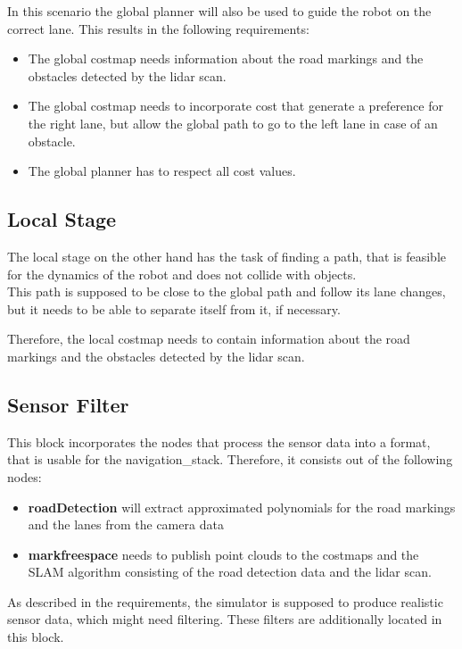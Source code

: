 In this scenario the global planner will also be used to guide the robot on the correct lane. This results in the following requirements:

\begin{itemize}
	\item The global costmap needs information about the road markings and the obstacles detected by the lidar scan.
	\item The global costmap needs to incorporate cost that generate a preference for the right lane, but allow the global path to go to the left lane in case of an obstacle.
	\item The global planner has to respect all cost values.
\end{itemize}

\subsection{Local Stage}
The local stage on the other hand has the task of finding a path, that is feasible for the dynamics of the robot and does not collide with objects.\\
This path is supposed to be close to the global path and follow its lane changes, but it needs to be able to separate itself from it, if necessary.

Therefore, the local costmap needs to contain information about the road markings and the obstacles detected by the lidar scan.


\subsection{Sensor Filter}

This block incorporates the nodes that process the sensor data into a format, that is usable for the navigation\_stack. 
Therefore, it consists out of the following nodes:

\begin{itemize}
	\item \textbf{roadDetection} will extract approximated polynomials for the road markings and the lanes from the camera data
	\item \textbf{markfreespace} needs to publish point clouds to the costmaps and the SLAM algorithm consisting of the road detection data and the lidar scan.
\end{itemize}

As described in the requirements, the simulator is supposed to produce realistic sensor data, which might need filtering. These filters are additionally located in this block.

